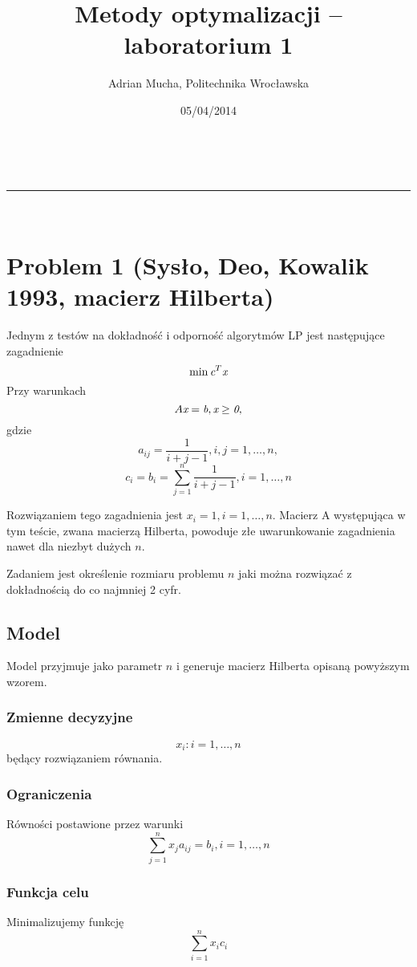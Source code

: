 \documentclass[a4paper,11pt]{article}
\makeatletter
\newcommand{\linia}{\rule{\linewidth}{0.5pt}}
\theoremstyle{mytheor}
\renewcommand{\maketitle}{
\begin{center}
\vspace{2ex}
{\huge \textsc{\@title}}
\vspace{1ex}
\\
\linia\\
\@author \hfill \@date
\vspace{4ex}
\end{center}
}
\makeatother
\begin{document}
\title{Metody optymalizacji – laboratorium 1}

\author{Adrian Mucha, Politechnika Wrocławska}

\date{05/04/2014}

\maketitle

\section*{Problem 1 (Sysło, Deo, Kowalik 1993, macierz Hilberta)}
Jednym z testów na dokładność i odporność algorytmów LP jest następujące zagadnienie
$$ \min \emph{c}^T\emph{x} $$
Przy warunkach
$$ A\emph{x} = \emph{b}, \emph{x}\geq\emph{0}, $$
gdzie
$$ a_{ij} = \frac{1}{i + j - 1}, i,j = 1,\ldots,n, $$
$$ c_i = b_i = \sum_{j=1}^n\frac{1}{i + j - 1}, i = 1,\ldots,n $$

Rozwiązaniem tego zagadnienia jest $x_i = 1, i = 1,\ldots, n$. Macierz A występująca w tym
teście, zwana macierzą Hilberta, powoduje złe uwarunkowanie zagadnienia nawet dla niezbyt
dużych $n$.

Zadaniem jest określenie rozmiaru problemu $n$ jaki można rozwiązać z dokładnością do co najmniej 2 cyfr.

\subsection*{Model}
Model przyjmuje jako parametr $n$ i generuje macierz Hilberta opisaną powyższym wzorem.

\subsubsection*{Zmienne decyzyjne}
$$x_i: i = 1,\ldots,n$$ będący rozwiązaniem równania.

\subsubsection*{Ograniczenia}
Równości postawione przez warunki
$$ \sum_{j=1}^n x_j a_{ij} = b_i, i = 1,\ldots,n$$

\subsubsection*{Funkcja celu}
Minimalizujemy funkcję
$$ \sum_{i = 1}^n x_i c_i $$
\end{document}
